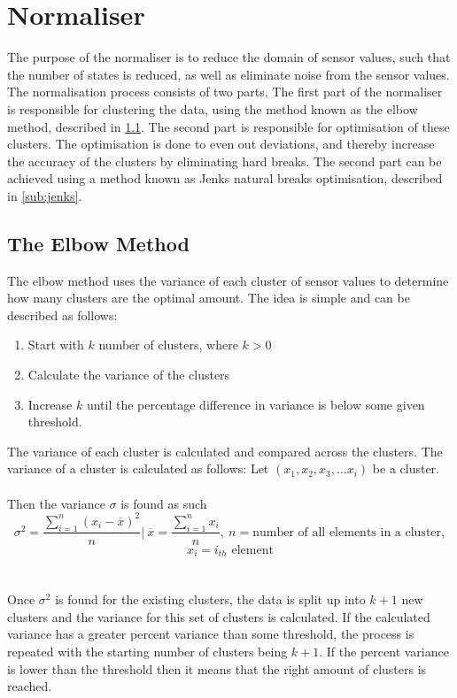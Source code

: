 \section{Normaliser}
\label{sec:normaliser}
The purpose of the normaliser is to reduce the domain of sensor values, such that the number of states is reduced, as well as eliminate noise from the sensor values. The normalisation process consists of two parts. The first part of the normaliser is responsible for clustering the data, using the method known as the elbow method, described in \cref{sub:elbow_method}. The second part is responsible for optimisation of these clusters. The optimisation is done to even out deviations, and thereby increase the accuracy of the clusters by eliminating hard breaks. The second part can be achieved using a method known as Jenks natural breaks optimisation, described in \cref{sub:jenks}.

\subsection{The Elbow Method}
\label{sub:elbow_method}
The elbow method uses the variance of each cluster of sensor values to determine how many clusters are the optimal amount. The idea is simple and can be described as follows:
\begin{enumerate}
\item Start with $k$ number of clusters, where $k>0$
\item Calculate the variance of the clusters
\item Increase $k$ until the percentage difference in variance is below some given threshold.
\end{enumerate}
The variance of each cluster is calculated and compared across the clusters. The variance of a cluster is calculated as follows:
Let $(x_1,x_2,x_3,...x_i)$ be a cluster.
\\\\Then the variance $\sigma$ is found as such
$$\sigma^2 = \frac{\displaystyle\sum_{i = 1}^{n}(x_{i}-\overline{x})^2 }{n} \Biggr\rvert\ \overline{x}  =\frac{\displaystyle\sum_{i=1}^{n}x_{i}}{n},\ n =\text{number of all elements in a cluster} ,$$
$$ x_{i} = i_{th} \text{ element} $$
\\\\
Once $\sigma^2$ is found for the existing clusters, the data is split up into $k+1$ new clusters and the variance for this set of clusters is calculated. If the calculated variance has a greater percent variance than some threshold, the process is repeated with the starting number of clusters being $k+1$. If the percent variance is lower than the threshold then it means that the right amount of clusters is reached.
